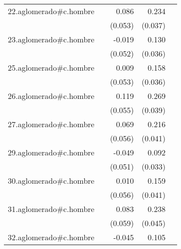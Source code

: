 {\begin{longtable}{l*{4}{D{.}{.}{-1}}}
\addlinespace
22.aglomerado#c.hombre&                     &       0.086         &       0.234\sym{***}&                     \\
            &                     &     (0.053)         &     (0.037)         &                     \\
\addlinespace
23.aglomerado#c.hombre&                     &      -0.019         &       0.130\sym{***}&                     \\
            &                     &     (0.052)         &     (0.036)         &                     \\
\addlinespace
25.aglomerado#c.hombre&                     &       0.009         &       0.158\sym{***}&                     \\
            &                     &     (0.053)         &     (0.036)         &                     \\
\addlinespace
26.aglomerado#c.hombre&                     &       0.119\sym{*}  &       0.269\sym{***}&                     \\
            &                     &     (0.055)         &     (0.039)         &                     \\
\addlinespace
27.aglomerado#c.hombre&                     &       0.069         &       0.216\sym{***}&                     \\
            &                     &     (0.056)         &     (0.041)         &                     \\
\addlinespace
29.aglomerado#c.hombre&                     &      -0.049         &       0.092\sym{**} &                     \\
            &                     &     (0.051)         &     (0.033)         &                     \\
\addlinespace
30.aglomerado#c.hombre&                     &       0.010         &       0.159\sym{***}&                     \\
            &                     &     (0.056)         &     (0.041)         &                     \\
\addlinespace
31.aglomerado#c.hombre&                     &       0.083         &       0.238\sym{***}&                     \\
            &                     &     (0.059)         &     (0.045)         &                     \\
\addlinespace
32.aglomerado#c.hombre&                     &      -0.045         &       0.105\sym{***}&                     \\

\end{longtable}}

